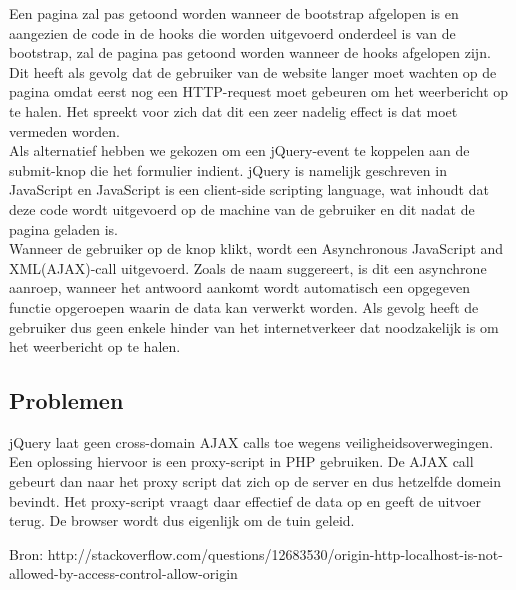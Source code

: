 Een pagina zal pas getoond worden wanneer de bootstrap afgelopen is en aangezien de code in de hooks die worden uitgevoerd onderdeel is van de bootstrap, zal de pagina pas getoond worden wanneer de hooks afgelopen zijn. Dit heeft als gevolg dat de gebruiker van de website langer moet wachten op de pagina omdat eerst nog een HTTP-request moet gebeuren om het weerbericht op te halen. Het spreekt voor zich dat dit een zeer nadelig effect is dat moet vermeden worden.\\
Als alternatief hebben we gekozen om een jQuery-event te koppelen aan de submit-knop die het formulier indient. jQuery is namelijk geschreven in JavaScript en JavaScript is een client-side scripting language, wat inhoudt dat deze code wordt uitgevoerd op de machine van de gebruiker en dit nadat de pagina geladen is.\\
Wanneer de gebruiker op de knop klikt, wordt een Asynchronous JavaScript and XML(AJAX)-call uitgevoerd.
Zoals de naam suggereert, is dit een asynchrone aanroep, wanneer het antwoord aankomt wordt automatisch een opgegeven functie opgeroepen waarin de data kan verwerkt worden. Als gevolg heeft de gebruiker dus geen enkele hinder van het internetverkeer dat noodzakelijk is om het weerbericht op te halen.


\subsection{Problemen}

jQuery laat geen cross-domain AJAX calls toe wegens veiligheidsoverwegingen. Een oplossing hiervoor is een proxy-script in PHP gebruiken.
De AJAX call gebeurt dan naar het proxy script dat zich op de server en dus hetzelfde domein bevindt. Het proxy-script vraagt daar effectief de data op en geeft de uitvoer terug.
De browser wordt dus eigenlijk om de tuin geleid.

Bron: http://stackoverflow.com/questions/12683530/origin-http-localhost-is-not-allowed-by-access-control-allow-origin
